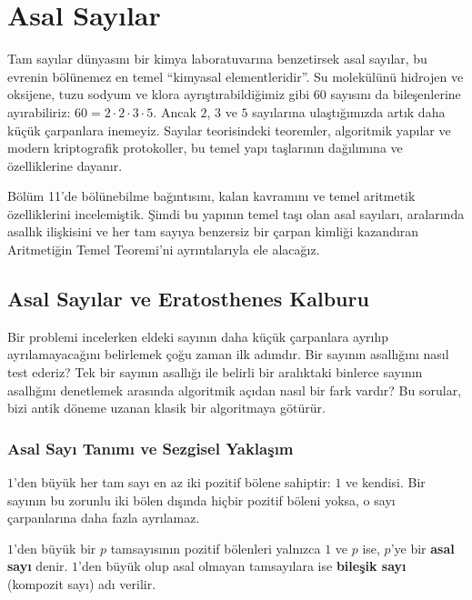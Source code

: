 \chapter[Asal Sayılar · \textit{Temel}]{Asal Sayılar}

Tam sayılar dünyasını bir kimya laboratuvarına benzetirsek asal sayılar, bu evrenin bölünemez en temel ``kimyasal elementleridir''. Su molekülünü hidrojen ve oksijene, tuzu sodyum ve klora ayrıştırabildiğimiz gibi $60$ sayısını da bileşenlerine ayırabiliriz: $60 = 2 \cdot 2 \cdot 3 \cdot 5$. Ancak $2$, $3$ ve $5$ sayılarına ulaştığımızda artık daha küçük çarpanlara inemeyiz. Sayılar teorisindeki teoremler, algoritmik yapılar ve modern kriptografik protokoller, bu temel yapı taşlarının dağılımına ve özelliklerine dayanır.

Bölüm 11'de bölünebilme bağıntısını, kalan kavramını ve temel aritmetik özelliklerini incelemiştik. Şimdi bu yapının temel taşı olan asal sayıları, aralarında asallık ilişkisini ve her tam sayıya benzersiz bir çarpan kimliği kazandıran Aritmetiğin Temel Teoremi'ni ayrıntılarıyla ele alacağız.

\section{Asal Sayılar ve Eratosthenes Kalburu}

Bir problemi incelerken eldeki sayının daha küçük çarpanlara ayrılıp ayrılamayacağını belirlemek çoğu zaman ilk adımdır. Bir sayının asallığını nasıl test ederiz? Tek bir sayının asallığı ile belirli bir aralıktaki binlerce sayının asallığını denetlemek arasında algoritmik açıdan nasıl bir fark vardır? Bu sorular, bizi antik döneme uzanan klasik bir algoritmaya götürür.

\subsection{Asal Sayı Tanımı ve Sezgisel Yaklaşım}

$1$'den büyük her tam sayı en az iki pozitif bölene sahiptir: $1$ ve kendisi. Bir sayının bu zorunlu iki bölen dışında hiçbir pozitif böleni yoksa, o sayı çarpanlarına daha fazla ayrılamaz.

\begin{definition}
$1$'den büyük bir $p$ tamsayısının pozitif bölenleri yalnızca $1$ ve $p$ ise, $p$'ye bir \textbf{asal sayı} denir. $1$'den büyük olup asal olmayan tamsayılara ise \textbf{bileşik sayı} (kompozit sayı) adı verilir.
\end{definition}

